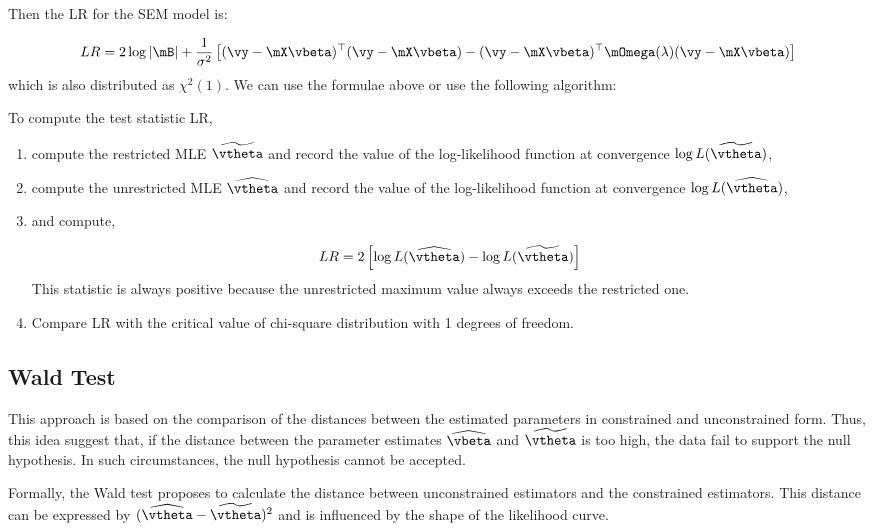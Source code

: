 \documentclass[english,12pt]{book}\usepackage[]{graphicx}\usepackage[]{xcolor}
\begin{document}
Then the LR for the SEM model is:

\begin{equation}
  LR = 2\log \left|\mB\right| + \frac{1}{\sigma^2}\left[(\vy-\mX\vbeta)^\top (\vy-\mX\vbeta) - (\vy-\mX\vbeta)^\top\mOmega(\lambda)(\vy-\mX\vbeta)\right]
\end{equation}
%
which is also distributed as $\chi^2(1)$.
We can use the formulae above or use the following algorithm:

\begin{algorithm}[LR Test]
To compute the test statistic LR,

\begin{enumerate}
  \item compute the restricted MLE $\widetilde{\vtheta}$ and record the value of the log-likelihood function at convergence $\log L(\widetilde{\vtheta})$,
  \item compute the unrestricted MLE $\widehat{\vtheta}$ and record the value of the log-likelihood function at convergence $\log L(\widehat{\vtheta})$,
  \item and compute, 
  
  \begin{equation*}
    LR = 2\left[\log L(\widehat{\vtheta}) - \log L(\widetilde{\vtheta})\right]
  \end{equation*}
  This statistic is always positive because the unrestricted maximum value always exceeds the restricted one. 
  \item Compare LR with the critical value of chi-square distribution with 1 degrees of freedom. 
\end{enumerate}
\end{algorithm}


\subsection{Wald Test}

This approach is based on the comparison of the distances between the estimated parameters in constrained and unconstrained form. Thus, this idea suggest that, if the distance between the parameter estimates $\widehat{\vbeta}$ and $\widetilde{\vtheta}$ is too high, the data fail to support the null hypothesis. In such circumstances, the null hypothesis cannot be accepted. 

Formally, the Wald test proposes to calculate the distance between unconstrained estimators and the constrained estimators. This distance can be expressed by $(\widehat{\vtheta}-\widetilde{\vtheta})^2$ and is influenced by the shape of the likelihood curve. 
\end{document}
